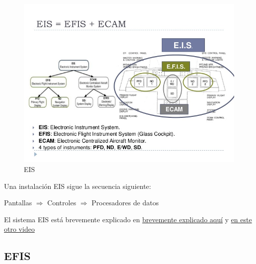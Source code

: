   \begin{figure}[!htb]
    \centering
    \includegraphics[width=\textwidth]{01.tablero.instrumentos/U01.imagenes/1.4.pantalla.electronica/01_eis.jpg}
    \caption{EIS}
    \label{fig:01.eis}
  \end{figure}







Una instalaci\'on \ac{EIS} sigue la secuencia siguiente:

\vspace{3mm}


 Pantallas \qquad $\Longrightarrow$ \qquad
 Controles  \qquad $\Longrightarrow$ \qquad
 Procesadores de datos 

 \begin{tcolorbox}
   El sistema EIS est\'a brevemente explicado en 
   \href{https://www.youtube.com/watch?v=AS91uq1tkjQ}{brevemente explicado aqu\'i} y \href{https://www.youtube.com/watch?v=2aix7kIL29o}{en este otro video}
 \end{tcolorbox}


\subsection{EFIS}
\label{sec:01.efis}


